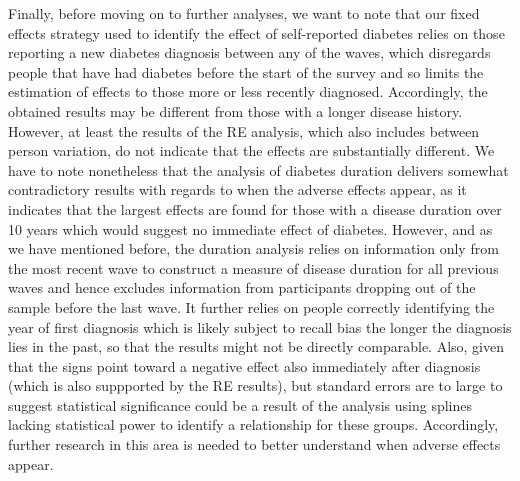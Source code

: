 Finally, before moving on to further analyses, we want to note that our fixed effects strategy used to identify the effect of self-reported diabetes relies on those reporting a new diabetes diagnosis between any of the waves, which disregards people that have had diabetes before the start of the survey and so limits the estimation of effects to those more or less recently diagnosed. Accordingly, the obtained results may be different from those with a longer disease history. However, at least the results of the \ac{RE} analysis, which also includes between person variation, do not indicate that the effects are substantially different. We have to note nonetheless that the analysis of diabetes duration delivers somewhat contradictory results with regards to when the adverse effects appear, as it indicates that the largest effects are found for those with a disease duration over 10 years which would suggest no immediate effect of diabetes. However, and as we have mentioned before, the duration analysis relies on information only from the most recent wave to construct a measure of disease duration for all previous waves and hence excludes information from participants dropping out of the sample before the last wave. It further relies on people correctly identifying the year of first diagnosis which is likely subject to recall bias the longer the diagnosis lies in the past, so that the results might not be directly comparable. Also, given that the signs point toward a negative effect also immediately after diagnosis (which is also suppported by the \ac{RE} results), but standard errors are to large to suggest statistical significance could be a result of the analysis using splines lacking statistical power to identify a relationship for these groups. Accordingly, further research in this area is needed to better understand when adverse effects appear.

  
  
  
  
  
  
  